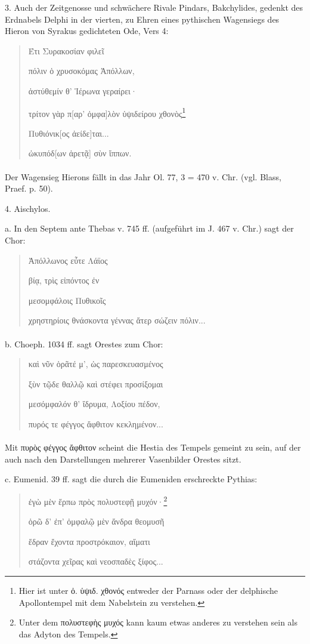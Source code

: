\documentclass[a4paper, 11pt, oneside]{article}
\begin{document}
3. Auch der Zeitgenosse und schwächere Rivale Pindars, Bakchylides, gedenkt des Erdnabels Delphi in der vierten, zu Ehren eines pythischen Wagensiegs des Hieron von Syrakus gedichteten Ode, Vers 4:
\begin{quotation}
Έτι Συρακοσίαν φιλεῖ

πόλιν ὁ χρυσοκόμας Ἀπόλλων,

ἀστύθεμίν θ' Ἱέρωνα γεραίρει·

τρίτον γὰρ π[αρ' ὀμφα]λὸν ὑψιδείρου χθονὸς\footnote{Hier ist unter ὀ. ὑψιδ. χθονός entweder der Parnass oder der delphische Apollontempel mit dem Nabelstein zu verstehen.}

Πυθιόνικ[ος ἀείδε]ται...

ὠκυπόδ[ων ἀρετᾷ] σὺν ἵππων.
\end{quotation}
\paragraph{}
Der Wagensieg Hierons fällt in das Jahr Ol. 77, 3 = 470 v. Chr. (vgl. Blass, Praef. p. 50).

4. Aischylos.

a. In den Septem ante Thebas v. 745 ff. (aufgeführt im J. 467 v. Chr.) sagt der Chor:
\begin{quotation}
Ἀπόλλωνος εὖτε Λάϊος

βίᾳ, τρὶς εἰπόντος ἐν

μεσομφάλοις Πυθικοῖς

χρηστηρίοις θνάσκοντα γέννας ἄτερ σώζειν πόλιν...
\end{quotation}
\paragraph{}
b. Choeph. 1034 ff. sagt Orestes zum Chor:
\begin{quotation}
καὶ νῦν ὁρᾶτέ μ', ὡς παρεσκευασμένος

ξὺν τῷδε θαλλῷ καὶ στέφει προσίξομαι

μεσόμφαλόν θ' ἴδρυμα, Λοξίου πέδον,

πυρός τε φέγγος ἄφθιτον κεκλημένον...
\end{quotation}
\paragraph{}
Mit πυρὸς φέγγος ἄφθιτον scheint die Hestia des Tempels gemeint zu sein, auf der auch nach den Darstellungen mehrerer Vasenbilder Orestes sitzt.

c. Eumenid. 39 ff. sagt die durch die Eumeniden erschreckte Pythias:
\begin{quotation}
ἐγὼ μὲν ἕρπω πρὸς πολυστεφῇ μυχόν·\footnote{Unter dem πολυστεφὴς μυχός kann kaum etwas anderes zu verstehen sein als das Adyton des Tempels.}

ὁρῶ δ' ἐπ' ὀμφαλῷ μὲν ἄνδρα θεομυσῆ

ἕδραν ἔχοντα προστρόκαιον, αἵματι

στάζοντα χεῖρας καὶ νεοσπαδὲς ξίφος...
\end{quotation}
\end{document}
